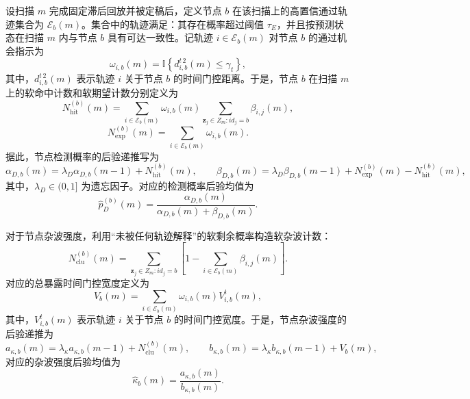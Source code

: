 \documentclass{xdupgthesis}
\begin{document}
设扫描 $m$ 完成固定滞后回放并被定稿后，定义节点 $b$ 在该扫描上的高置信通过轨迹集合为 $\mathcal E_b(m)$。集合中的轨迹满足：其存在概率超过阈值 $\tau_E$，并且按预测状态在扫描 $m$ 内与节点 $b$ 具有可达一致性。记轨迹 $i\in\mathcal E_b(m)$ 对节点 $b$ 的通过机会指示为
\begin{equation}
	\omega_{i,b}(m)=
	\mathbb I\left\{
	d^{t\,2}_{i,b}(m)\le \gamma_t
	\right\},
	\label{eq:ch3_pass_indicator}
\end{equation}
其中，$d^{t\,2}_{i,b}(m)$ 表示轨迹 $i$ 关于节点 $b$ 的时间门控距离。于是，节点 $b$ 在扫描 $m$ 上的软命中计数和软期望计数分别定义为
\begin{equation}
	N_{\mathrm{hit}}^{(b)}(m)=
	\sum_{i\in\mathcal E_b(m)}
	\omega_{i,b}(m)
	\sum_{\mathbf z_j\in Z_m:id_j=b}
	\beta_{i,j}(m),
	\label{eq:ch3_soft_hit}
\end{equation}
\begin{equation}
	N_{\mathrm{exp}}^{(b)}(m)=
	\sum_{i\in\mathcal E_b(m)}
	\omega_{i,b}(m).
	\label{eq:ch3_soft_exp}
\end{equation}
据此，节点检测概率的后验递推写为
\begin{equation}
	\alpha_{D,b}(m)=
	\lambda_D\alpha_{D,b}(m-1)+N_{\mathrm{hit}}^{(b)}(m),
	\qquad
	\beta_{D,b}(m)=
	\lambda_D\beta_{D,b}(m-1)+N_{\mathrm{exp}}^{(b)}(m)-N_{\mathrm{hit}}^{(b)}(m),
	\label{eq:ch3_beta_update}
\end{equation}
其中，$\lambda_D\in(0,1]$ 为遗忘因子。对应的检测概率后验均值为
\begin{equation}
	\hat p_D^{(b)}(m)=
	\frac{\alpha_{D,b}(m)}
	{\alpha_{D,b}(m)+\beta_{D,b}(m)}.
	\label{eq:ch3_pD_mean}
\end{equation}

对于节点杂波强度，利用“未被任何轨迹解释”的软剩余概率构造软杂波计数：
\begin{equation}
	N_{\mathrm{clu}}^{(b)}(m)=
	\sum_{\mathbf z_j\in Z_m:id_j=b}
	\left[
	1-\sum_{i\in\mathcal E_b(m)}\beta_{i,j}(m)
	\right].
	\label{eq:ch3_soft_clutter}
\end{equation}
对应的总暴露时间门控宽度定义为
\begin{equation}
	V_b(m)=
	\sum_{i\in\mathcal E_b(m)}
	\omega_{i,b}(m)V^{t}_{i,b}(m),
	\label{eq:ch3_exposure_volume}
\end{equation}
其中，$V^{t}_{i,b}(m)$ 表示轨迹 $i$ 关于节点 $b$ 的时间门控宽度。于是，节点杂波强度的后验递推为
\begin{equation}
	a_{\kappa,b}(m)=
	\lambda_{\kappa}a_{\kappa,b}(m-1)+N_{\mathrm{clu}}^{(b)}(m),
	\qquad
	b_{\kappa,b}(m)=
	\lambda_{\kappa}b_{\kappa,b}(m-1)+V_b(m),
	\label{eq:ch3_kappa_update}
\end{equation}
对应的杂波强度后验均值为
\begin{equation}
	\hat\kappa_b(m)=\frac{a_{\kappa,b}(m)}{b_{\kappa,b}(m)}.
	\label{eq:ch3_kappa_mean_v2}
\end{equation}
\end{document}
